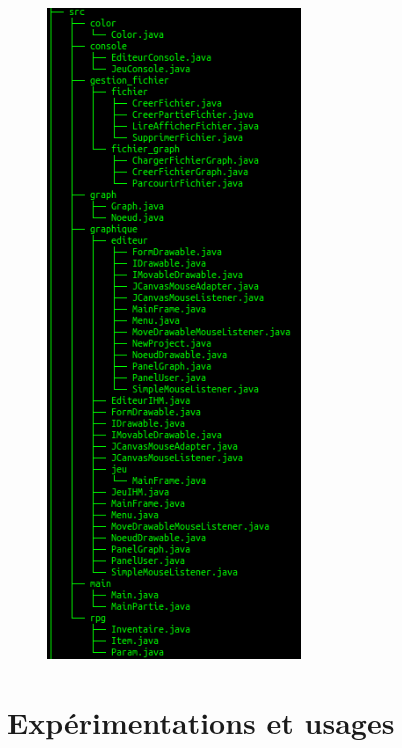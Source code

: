 \documentclass[12pt]{article}
\begin{document}
\begin{figure}[h]
  \centering
    \includegraphics[width=0.6\textwidth]{Tree2}
\end{figure}


\clearpage
\section{Expérimentations et usages}
\end{document}
